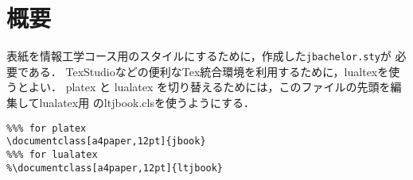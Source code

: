 \chapter*{概要}

表紙を情報工学コース用のスタイルにするために，作成した{\tt jbachelor.sty}が
必要である．
TexStudioなどの便利なTex統合環境を利用するために，lualtexを使うとよい．
platex と lualatex を切り替えるためには，このファイルの先頭を編集してlualatex用
のltjbook.clsを使うようにする．
\begin{verbatim}
%%% for platex
\documentclass[a4paper,12pt]{jbook}
%%% for lualatex
%\documentclass[a4paper,12pt]{ltjbook}
\end{verbatim}

